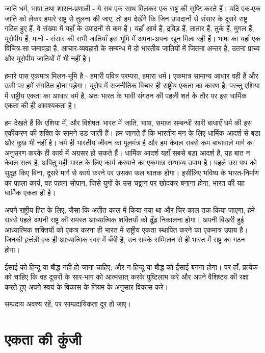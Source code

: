 जाति धर्म, भाषा तथा शासन-प्रणाली - ये सब एक साथ मिलकर एक राष्ट्र की सृष्टि करते हैं। यदि एक-एक जाति को लेकर हमारे राष्ट्र से तुलना की जाए, तो हम देखेंगे कि जिन उपादानों से संसार के दूसरे राष्ट्र गठित हुए हैं, वे संख्या में यहाँ के उपादनों से कम हैं। यहाँ आर्य हैं, द्रविड़ हैं, तातार हैं, तुर्क हैं, मुगल हैं, यूरोपीय हैं, मानो - संसार की सभी जातियाँ इस भूमि में अपना-अपना खून मिला रही हैं। भाषा का यहाँ एक विचित्र-सा जमावड़ा है, आचार-व्यवहारों के सम्बन्ध में दो भारतीय जातियों में जितना अन्तर है, उतना प्राच्य और यूरोपीय जातियों में भी नहीं है। 

हमारे पास एकमात्र मिलन-भूमि है - हमारी पवित्र परम्परा, हमारा धर्म। एकमात्र सामान्य आधार वही हैं और उसी पर हमें संगठित होना पड़ेगा। यूरोप में राजनीतिक विचार ही राष्ट्रीय एकता का कारण है; परन्तु एशिया में राष्ट्रीय एकता का आधार धर्म है, अतः भारत के भावी संगठन की पहली शर्त के तौर पर इस धार्मिक एकता की ही आवश्यकता है। 

हम देखते हैं कि एशिया में, और विशेषतः भारत में जाति, भाषा, समाज सम्बन्धी सारी बाधाएँ धर्म की इस एकीकरण की शक्ति के सामने उड़ जाती हैं। हम जानते हैं कि भारतीय मन के लिए धार्मिक आदर्श से बड़ा और कुछ भी नहीं है। धर्म ही भारतीय जीवन का मूलमंत्र है और हम केवल सबसे कम बाधावाले मार्ग का अनुसरण करके ही कार्य में अग्रसर हो सकते हैं। धार्मिक आदर्श यहाँ सबसे बड़ा आदर्श है, यह बात न केवल सत्य है, अपितु यही भारत के लिए कार्य करवाने का एकमात्र सम्भाव्य उपाय है। पहले उस पथ को सुदृढ़ किए बिना, दूसरे मार्ग से कार्य करने पर उसका फल घातक होगा। इसीलिए भविष्य के भारत-निर्माण का पहला कार्य, वह पहला सोपान, जिसे युगों के उस चट्टान पर खोदकर बनाना होगा, भारत की यह धार्मिक एकता ही है। 

अपने राष्ट्रीय हित के लिए, जैसा कि अतीत काल में किया गया था और चिर काल तक किया जाएगा, हमें सबसे पहले अपनी राष्ट्र की समस्त आध्यात्मिक शक्तियों को ढूँढ़ निकालना होगा। अपनी बिखरी हुई आध्यात्मिक शक्तियों को एकत्र करना ही भारत में राष्ट्रीय एकता स्थापित करने का एकमात्र उपाय है। जिनकी हृत्तंत्री एक ही आध्यात्मिक स्वर में बँधी है, उन सबके सम्मिलन से ही भारत में राष्ट्र का गठन होगा। 

ईसाई को हिन्दू या बौद्ध नहीं हो जाना चाहिए; और न हिन्दू या बौद्ध को ईसाई बनना होगा। पर हाँ, प्रत्येक को चाहिए कि वह दूसरों के सार-भाग को आत्मसात् करके पुष्टिलाभ करे और अपने वैशिष्ट्य की रक्षा करते हुए अपने स्वयं के विकास के नियम के अनुसार विकास करे। 

सम्प्रदाय अवश्य रहें, पर साम्प्रदायिकता दूर हो जाए।


\section*{एकता की कुंजी}

